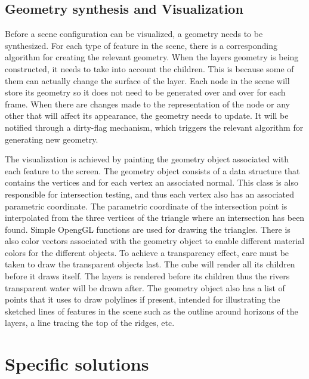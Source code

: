 \documentclass[a4paper,12pt]{report}
\begin{document}
\subsection{Geometry synthesis and Visualization}
Before a scene configuration can be visualized, a geometry needs to be synthesized. For each type of feature in the scene, there is a corresponding algorithm for creating the relevant geometry. When the layers geometry is being constructed, it needs to take into account the children. This is because some of them can actually change the surface of the layer. Each node in the scene will store its geometry so it does not need to be generated over and over for each frame. When there are changes made to the representation of the node or any other that will affect its appearance, the geometry needs to update. It will be notified through a dirty-flag mechanism, which triggers the relevant algorithm for generating new geometry.

The visualization is achieved by painting the geometry object associated with each feature to the screen. The geometry object consists of a data structure that contains the vertices and for each vertex an associated normal. This class is also responsible for intersection testing, and thus each vertex also has an associated parametric coordinate. The parametric coordinate of the intersection point is interpolated from the three vertices of the triangle where an intersection has been found. Simple OpengGL functions are used for drawing the triangles. There is also color vectors associated with the geometry object to enable different material colors for the different objects. To achieve a transparency effect, care must be taken to draw the transparent objects last. The cube will render all its children before it draws itself. The layers is rendered before its children thus the rivers transparent water will be drawn after. The geometry object also has a list of points that it uses to draw polylines if present, 
intended for 
illustrating the sketched lines of features in the scene such as the outline around horizons of the layers, a line tracing the top of the ridges, etc.

\section{Specific solutions}
\label{subsec:indepth}
\end{document}
